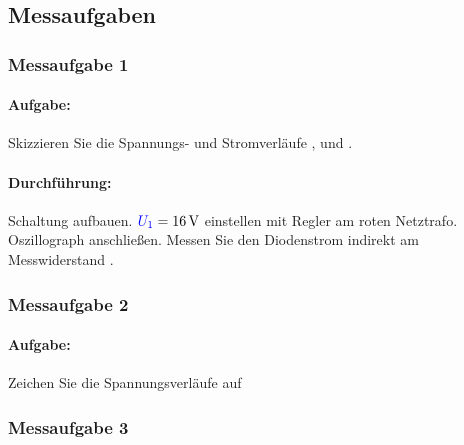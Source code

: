 \documentclass[11pt,a4paper,titlepage,parskip=half]{scrreprt}
\begin{document}
		\subsection{Messaufgaben}
			\subsubsection{Messaufgabe 1}
				\paragraph{Aufgabe:} Skizzieren Sie die Spannungs- und Stromverläufe ,  und .
				\paragraph{Durchführung:} Schaltung aufbauen. $\textcolor{blue}{U_1} = \SI{16}{\volt}$ einstellen mit Regler am roten Netztrafo. Oszillograph anschließen. Messen Sie den Diodenstrom  indirekt am Messwiderstand .

				
						
			\subsubsection{Messaufgabe 2}
                \paragraph{Aufgabe:} Zeichen Sie die Spannungsverläufe auf
            \subsubsection{Messaufgabe 3}
\end{document}
